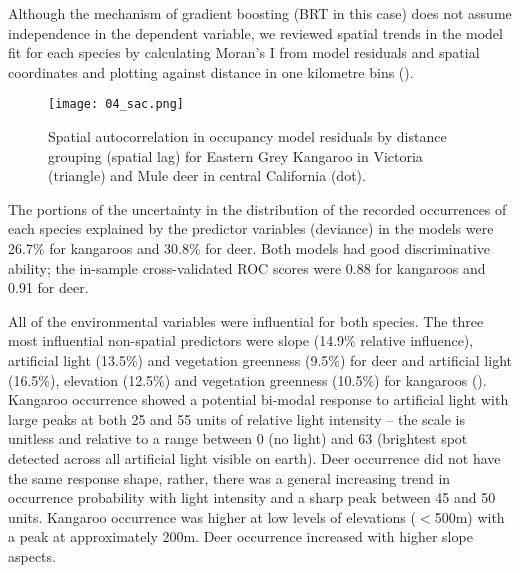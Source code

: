 Although the mechanism of gradient boosting (BRT in this case) does not assume independence in the dependent variable, we reviewed spatial trends in the model fit for each species by calculating Moran’s I from model residuals and spatial coordinates and plotting against distance in one kilometre bins ().

\begin{figure*}[!t]
  \centering
  \texttt{[image: 04\_sac.png]}
  \caption[Spatial autocorrelation in occupancy model residuals for kangaroos and deer]{Spatial autocorrelation in occupancy model residuals by distance grouping (spatial lag) for Eastern Grey Kangaroo in Victoria (triangle) and Mule deer in central California (dot).}
  \label{cal_sac_occ}
\end{figure*}

The portions of the uncertainty in the distribution of the recorded occurrences of each species explained by the predictor variables (deviance) in the models were 26.7\% for kangaroos and 30.8\% for deer. Both models had good discriminative ability; the in-sample cross-validated ROC scores were 0.88 for kangaroos and 0.91 for deer.

All of the environmental variables were influential for both species. The three most influential non-spatial predictors were slope (14.9\% relative influence), artificial light (13.5\%) and vegetation greenness (9.5\%) for deer and artificial light (16.5\%), elevation (12.5\%) and vegetation greenness (10.5\%) for kangaroos ().  Kangaroo occurrence showed a potential bi-modal response to artificial light with large peaks at both 25 and 55 units of relative light intensity -- the scale is unitless and relative to a range between 0 (no light) and 63 (brightest spot detected across all artificial light visible on earth).  Deer occurrence did not have the same response shape, rather, there was a general increasing trend in occurrence probability with light intensity and a sharp peak between 45 and 50 units. Kangaroo occurrence was higher at low levels of elevations ($<$500m) with a peak at approximately 200m.  Deer occurrence increased with higher slope aspects.

